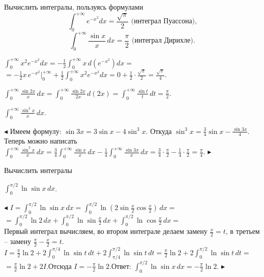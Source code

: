 \documentclass[a5paper,10pt]{article}
\begin{document}
\bigskip\noindent Вычислить интегралы, пользуясь формулами
$$\int_0^{+\infty}e^{-x^2}dx=\frac{\sqrt\pi}{2}\mbox{ (интеграл Пуассона),}$$
$$\int_0^{+\infty}\frac{\sin x}{x}\,dx=\frac{\pi}{2}\mbox{ (интеграл Дирихле).}$$

\medskip
{} $\displaystyle \int_{0}^{+\infty}x^2e^{-x^2}dx=
-\frac12\int_{0}^{+\infty}x\,d(e^{-x^2})dx=$\\
$\displaystyle =-\frac12x\,e^{-x^2}\Big|_{0}^{+\infty}+\frac12\int_{0}^{+\infty}x^2e^{-x^2}dx=
0+\frac12\cdot\frac{\sqrt\pi}{2}=\frac{\sqrt\pi}{4}$.

\medskip
{} $\displaystyle \int_{0}^{+\infty}\frac{\sin 2x}{x}\,dx=\int_{0}^{+\infty}\frac{\sin 2x}{2x}\,d(2x)=
\int_{0}^{+\infty}\frac{\sin t}{t}\,dt=\frac{\pi}{2}$.

\medskip
{} $\displaystyle \int_{0}^{+\infty}\frac{\sin^3x}{x}\,dx$.

\smallskip
\noindent $\blacktriangleleft$ Имеем формулу: $\sin3x=3\sin x-4\sin^3x$. Откуда $\displaystyle \sin^3x=\frac34\sin x-\frac{\sin 3x}{4}$. Теперь можно написать\\
$\displaystyle \int_{0}^{+\infty}\frac{\sin^3x}{x}\,dx=\frac34\int_{0}^{+\infty}\frac{\sin x}{x}\,dx-
\frac14\int_{0}^{+\infty}\frac{\sin 3x}{x}\,dx=\frac34\cdot\frac{\pi}{2}-\frac14\cdot\frac{\pi}{2}=\frac{\pi}{4}$. $\blacktriangleright$

\bigskip\noindent Вычислить интегралы

\medskip
{} $\displaystyle \int_{0}^{\pi/2}\ln \sin x\,dx$.

\smallskip
\noindent $\blacktriangleleft$ $\displaystyle I=\int_{0}^{\pi/2}\ln \sin x\,dx=
\int_{0}^{\pi/2}\ln\left(2\sin \frac x2\cos \frac x2\right)\,dx=$\\
$\displaystyle =\int_{0}^{\pi/2}\ln2\,dx+\int_{0}^{\pi/2}\ln\sin \frac x2\,dx+\int_{0}^{\pi/2}\ln\cos \frac x2\,dx=$\\
Первый интеграл вычисляем, во втором интеграле делаем замену $\displaystyle \frac x2=t$,
в третьем -- замену $\displaystyle \frac{\pi}{2}-\frac x2=t$.\\
$\displaystyle I=\frac{\pi}{2}\ln2+2\int_{0}^{\pi/4}\ln\sin t\,dt+2\int_{\pi/4}^{\pi/2}\ln\sin t\,dt=
\frac{\pi}{2}\ln2+2\int_{0}^{\pi/2}\ln\sin t\,dt=$\\
$\displaystyle =\frac{\pi}{2}\ln2+2I.$\quad Отсюда $\displaystyle I=-\frac{\pi}{2}\ln2$.\qquad Ответ:
$\displaystyle \int_{0}^{\pi/2}\ln \sin x\,dx=-\frac{\pi}{2}\ln2$. $\blacktriangleright$
\end{document}
